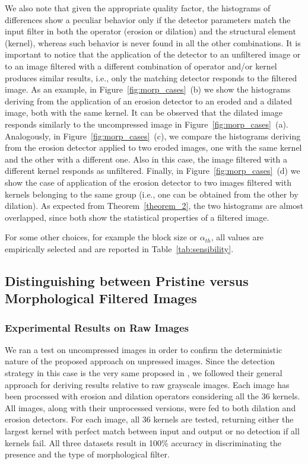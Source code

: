 \documentclass{ieeeaccess}
\begin{document}
We also note that given the appropriate quality factor, the histograms of differences show a peculiar behavior only if the detector parameters match the input filter in both the operator (erosion or dilation) and the structural element (kernel), whereas such behavior is never found in all the other combinations. It is important to notice that the application of the detector to an unfiltered image or to an image filtered with a different combination of operator and/or kernel produces similar results, i.e., only the matching detector responds to the filtered image. As an example, in Figure~\ref{fig:morp_cases}~(b) we show the histograms deriving from the application of an erosion detector to an eroded and a dilated image, both with the same kernel. It can be observed that the dilated image responds similarly to the uncompressed image in Figure~\ref{fig:morp_cases}~(a). Analogously, in Figure~\ref{fig:morp_cases}~(c), we compare the histograms deriving from the erosion detector applied to two eroded images, one with the same kernel and the other with a different one. Also in this case, the image filtered with a different kernel responds as unfiltered. Finally, in Figure~\ref{fig:morp_cases}~(d) we show the case of application of the erosion detector to two images filtered with kernels belonging to the same group (i.e., one can be obtained from the other by dilation). As expected from Theorem~\ref{theorem_2}, the two histograms are almost overlapped, since both show the statistical properties of a filtered image.

For some other choices, for example the block size or $\alpha_{th}$, all values are empirically selected and are reported in Table~\ref{tab:sensibility}. 

\subsection{Distinguishing between Pristine versus Morphological Filtered Images}
\label{sec:compr_res}

\subsubsection{Experimental Results on Raw Images}

We ran a test on uncompressed images in order to confirm the deterministic nature of the proposed approach on unpressed images. Since the detection strategy in this case is the very same proposed in \cite{de2017detecting}, we followed their general approach for deriving results relative to raw grayscale images. Each image has been processed with erosion and dilation operators considering all the 36 kernels.
All images, along with their unprocessed versions, were fed to both dilation and erosion detectors. For each image, all 36 kernels are tested, returning either the largest kernel with perfect match between input and output or no detection if all kernels fail. All three datasets result in 100\% accuracy in discriminating the presence and the type of morphological filter.%
\end{document}

